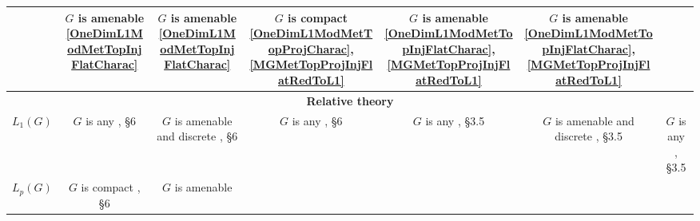 \documentclass{article}
\theoremstyle{plain}
\theoremstyle{definition}
\begin{document}
\begin{fulltext}
\begin{table}[ht]
\begin{tiny}
\begin{tabular}{|c|c|c|c|c|c|c|}
{            } & 
            \shortstack{
                $G$ is amenable \\ 
            {\ref{OneDimL1ModMetTopInjFlatCharac}}
            } & 
            \shortstack{
                $G$ is amenable \\ 
            {\ref{OneDimL1ModMetTopInjFlatCharac}}
            } & 
            \shortstack{
                $G$ is compact \\ 
            {\ref{OneDimL1ModMetTopProjCharac}},
            {\ref{MGMetTopProjInjFlatRedToL1}}
            } & 
            \shortstack{
                $G$ is amenable \\ 
            {\ref{OneDimL1ModMetTopInjFlatCharac}},
            {\ref{MGMetTopProjInjFlatRedToL1}}
            } & 
            \shortstack{
                $G$ is amenable \\ 
            {\ref{OneDimL1ModMetTopInjFlatCharac}},
            {\ref{MGMetTopProjInjFlatRedToL1}}
            } \\ 
        \hline
            \multicolumn{7}{c}{\textbf{Relative theory}} \\
        \hline
            $L_1(G)$ & 
            \shortstack{
                $G$ is any \\
				{\cite{DalPolHomolPropGrAlg}, \S 6}
            } & 
            \shortstack{
                $G$ is amenable \\  and discrete \\
                {\cite{DalPolHomolPropGrAlg}, \S 6}
            } & 
            \shortstack{
                $G$ is any \\
				{\cite{DalPolHomolPropGrAlg}, \S 6}
            } & 
            \shortstack{
                $G$ is any \\
				{\cite{RamsHomPropSemgroupAlg}, \S 3.5}
            } & 
            \shortstack{
                $G$ is amenable \\  and discrete \\
                {\cite{RamsHomPropSemgroupAlg}, \S 3.5}
            } & 
            \shortstack{
                $G$ is any \\
				{\cite{RamsHomPropSemgroupAlg}, \S 3.5}
            } \\ 
        \hline
            $L_p(G)$ & 
            \shortstack{
                $G$ is compact \\
				{\cite{DalPolHomolPropGrAlg}, \S 6}
            } & 
            \shortstack{
                $G$ is amenable \\
}
\end{tabular}
\end{tiny}
\end{table}
\end{fulltext}
\end{document}
